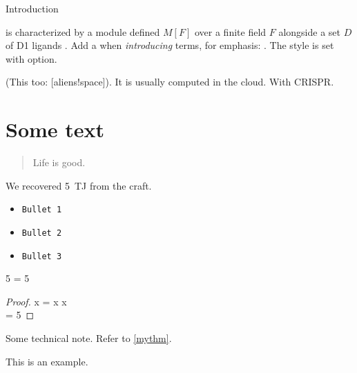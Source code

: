 
\begin{MainChapter}{Introduction}




 is characterized by a module defined $M[F]$ over a finite field $F$ alongside a set $D$ of \ac{D1} ligands \cite{yolov6}.
Add a \code{*} when \emph{introducing} terms, for emphasis: .
The style is set with  option.

(This too: [aliens!space]).
It is usually computed in the cloud. With \ac{CRISPR}.

\section{Some text}

\blockcquote{johnson2022}{Life is good.}

We recovered \qty{5}{\tera\joule} from the craft.

\begin{itemize}
    \item\texttt{Bullet 1}
    \item\texttt{Bullet 2}
    \item\texttt{Bullet 3}
\end{itemize}

\begin{criterion}[label=mythm, name=Fiveness]
5 = 5
\end{criterion}

\begin{proof}
x = x \forall x\\
 = 5
\end{proof}

\begin{BoxNote}
Some technical note.
Refer to \cref{mythm}.
\end{BoxNote}

\begin{BoxExample}
This is an example.
\end{BoxExample}



\end{MainChapter}
